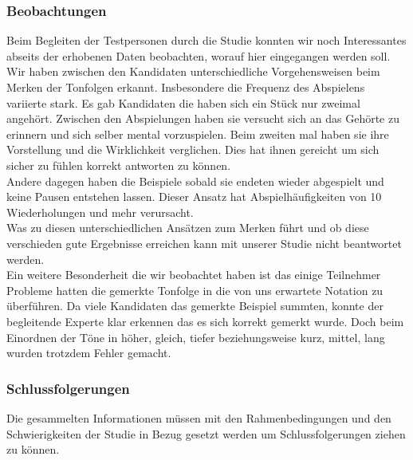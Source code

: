 \documentclass{acm_proc_article-sp}
\begin{document}
\subsubsection{Beobachtungen}
Beim Begleiten der Testpersonen durch die Studie konnten wir noch Interessantes abseits der erhobenen Daten beobachten, worauf hier eingegangen werden soll.\\

Wir haben zwischen den Kandidaten unterschiedliche Vorgehensweisen beim Merken der Tonfolgen erkannt. Insbesondere die Frequenz des Abspielens variierte stark. Es gab Kandidaten die haben sich ein Stück nur zweimal angehört. Zwischen den Abspielungen haben sie versucht sich an das Gehörte zu erinnern und sich selber mental vorzuspielen. Beim zweiten mal haben sie ihre Vorstellung und die Wirklichkeit verglichen. Dies hat ihnen gereicht um sich sicher zu fühlen korrekt antworten zu können.\\
Andere dagegen haben die Beispiele sobald sie endeten wieder abgespielt und keine Pausen entstehen lassen. Dieser Ansatz hat Abspielhäufigkeiten von 10 Wiederholungen und mehr verursacht.\\ 
Was zu diesen unterschiedlichen Ansätzen zum Merken führt und ob diese verschieden gute Ergebnisse erreichen kann mit unserer Studie nicht beantwortet werden.\\

Ein weitere Besonderheit die wir beobachtet haben ist das einige Teilnehmer Probleme hatten die gemerkte Tonfolge in die von uns erwartete Notation zu überführen. Da viele Kandidaten das gemerkte Beispiel summten, konnte der begleitende Experte klar erkennen das es sich korrekt gemerkt wurde. Doch beim Einordnen der Töne in höher, gleich, tiefer beziehungsweise kurz, mittel, lang wurden trotzdem Fehler gemacht.

\subsubsection{Schlussfolgerungen}
Die gesammelten Informationen müssen mit den Rahmenbedingungen und den Schwierigkeiten der Studie in Bezug gesetzt werden um Schlussfolgerungen ziehen zu können.
\end{document}
